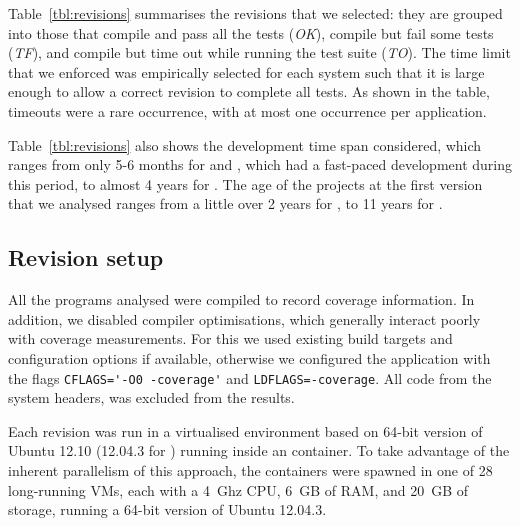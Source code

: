 Table~\ref{tbl:revisions} summarises the revisions that we selected:
they are grouped into those that compile and pass all the tests
(\textit{OK}), compile but fail some tests (\textit{TF}),
and compile but time out while running the test suite
(\textit{TO}).
The time limit that we enforced was empirically selected for
each system such that it is large enough to allow a correct revision
to complete all tests. As shown in the table, timeouts were a rare
occurrence, with at most one occurrence per application.

Table~\ref{tbl:revisions} also shows the development time span
considered, which ranges from only 5-6 months for \git and \redis,
which had a fast-paced development during this period, to almost 4
years for \memcached. The age of the projects at the first version
that we analysed ranges from a little over 2 years for \lighttpdtwo,
to 11 years for \binutils.

\subsection{Revision setup}

All the programs analysed were compiled to record coverage information. In
addition, we disabled compiler optimisations, which generally interact poorly
with coverage measurements. For this we used existing build targets and
configuration options if available, otherwise we configured the application
with the flags \lstinline`CFLAGS='-O0 -coverage'` and
\lstinline`LDFLAGS=-coverage`. All code from the system headers, \ie
{} was excluded from the results.

Each revision was run in a virtualised environment based on 64-bit version of
Ubuntu 12.10 (12.04.3 for \git) running inside an \lxc container.  To take
advantage of the inherent parallelism of this approach, the containers were
spawned in one of 28 long-running \xen VMs, each with a 4~Ghz CPU, 6~GB of RAM,
and 20~GB of storage, running a 64-bit version of Ubuntu 12.04.3.

